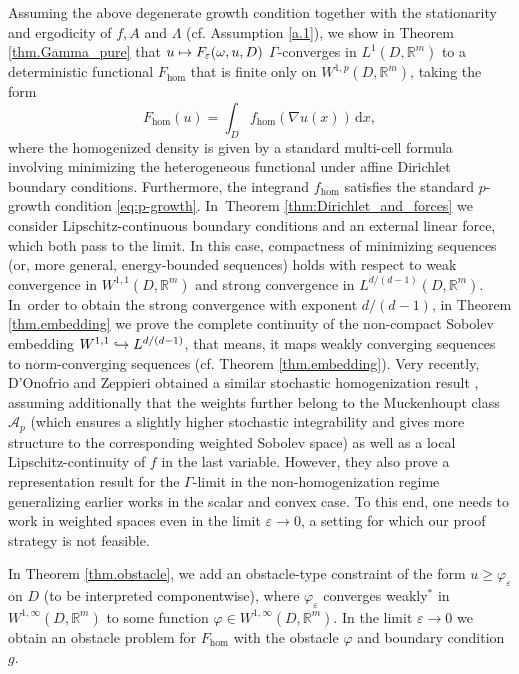 \documentclass[11pt]{article}
\newcommand{\cf}{cf.\xspace}
\numberwithin{equation}{section}
\def\mto{\mathchoice{\longmapsto}{\mapsto}{\mapsto}{\mapsto}}
\def\hto{\mathrel{\lhook\joinrel\to}}
\theoremstyle{definition}
\let\e\varepsilon
\let\w\omega
\newcommand{\dx}{\,\mathrm{d}x}
\newcommand{\R}{\mathbb{R}}
\begin{document}
Assuming the above degenerate growth condition together with the stationarity and ergodicity of $f,A$ and $\Lambda$ (\cf Assumption \ref{a.1}), we show in Theorem \ref{thm.Gamma_pure} that $u\mto F_{\e}(\w,u,D)$ $\Gamma$-converges in $L^1(D,\R^m)$ to a deterministic functional $F_{\hom}$ that is finite only on $W^{1,p}(D,\R^m)$, taking the form\vspace*{-3pt}
\begin{equation*}
F_{\hom}(u)=\int_D f_{\hom}(\nabla u(x))\dx,
\end{equation*}
where the homogenized density is given by a standard multi-cell formula involving minimizing the heterogeneous functional under affine Dirichlet boundary conditions. Furthermore, the integrand $f_{\hom}$ satisfies the standard $p$-growth condition \eqref{eq:p-growth}. In~Theorem \ref{thm:Dirichlet_and_forces} we consider Lipschitz-continuous boundary conditions and an external linear force, which both pass to the limit. In this case, compactness of minimizing sequences (or, more general, energy-bounded sequences) holds with respect to weak convergence in $W^{1,1}(D,\R^m)$ and strong convergence in $L^{d/(d-1)}(D,\R^m)$. In~order to obtain the strong convergence with exponent $d/(d-1)$, in Theorem \ref{thm.embedding} we prove the complete continuity of the non-compact Sobolev embedding $W^{1,1}\hto\nobreak L^{d/(d-1)}$, that means, it maps weakly converging sequences to norm-converging sequences (\cf Theorem \ref{thm.embedding}). Very recently, D'Onofrio and Zeppieri obtained a similar stochastic homogenization result \cite{D'OnZe}, assuming additionally that the weights further belong to the Muckenhoupt class $\mathcal{A}_p$ (which ensures a slightly higher stochastic integrability and gives more structure to the corresponding weighted Sobolev space) as well as a local Lipschitz-continuity of $f$ in the last variable. However, they also prove a representation result for the $\Gamma$-limit in the non-homogenization regime generalizing earlier works \cite{CaSo,DeArc} in the scalar and convex case. To this end, one needs to work in weighted spaces even in the limit $\e\to 0$, a setting for which our proof strategy is not feasible.

In Theorem \ref{thm.obstacle}, we add an obstacle-type constraint of the form $u\geq\varphi_{\e}$ on $D$ (to be interpreted componentwise), where $\varphi_{\e}$ converges weakly$^*$ in $W^{1,\infty}(D,\R^m)$ to some function $\varphi\in W^{1,\infty}(D,\R^m)$. In the limit $\e\to 0$ we obtain an obstacle problem for $F_{\hom}$ with the obstacle $\varphi$ and boundary condition $g$.
\end{document}
